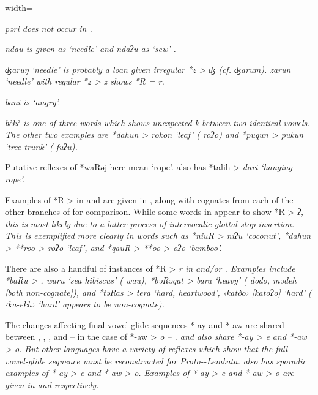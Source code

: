 \begin{table}[p]
\begin{adjustbox}{width=\textwidth}
\begin{threeparttable}
\begin{tablenotes}
{								\it{pəri} does not occur in \citet[155]{PareiraLewis1998}.}
			\item[v]	{ \it{ndau} is given as ‘needle’ and \it{ndaʔu} as ‘sew’ \citep[99]{Ismail1985}.}
			\item[vi]	{ \it{ʤaruŋ} ‘needle’ is probably a loan given irregular *z > \it{ʤ}
								(cf.  \it{ʤarum}).
								 \it{zarun} ‘needle’ with regular *z > \it{z} shows  *R = \it{r.}}
			\item[vii]	{ \it{bani} is ‘angry’.}
			\item[viii]	{ \it{\<bèkè\>} is one of three words which shows unexpected
								\it{k} between two identical vowels.
								The other two examples are *dahun > \it{rokon} ‘leaf’ ( \it{roʔo})
								and *puqun > \it{pukun} ‘tree trunk’ ( \it{fuʔu}).}
			\item[ix]	{Putative reflexes of *waRəj here mean ‘rope’.
								 also has *talih > \it{dari} ‘hanging rope’.}
		\end{tablenotes}
	\end{threeparttable}
\end{adjustbox}
\end{table}

Examples of *R > {\0} in 
and  are given in , along with cognates from each of the other branches
of  for comparison.
While some words in  appear to show *R > \it{ʔ},
this is most likely due to a latter process of intervocalic glottal stop insertion.
This is exemplified more clearly in words such as *niuR > \it{niʔu}
‘coconut’, *dahun > **roo > \it{roʔo} ‘leaf’,
and *qauR > **oo > \it{oʔo} ‘bamboo’.

There are also a handful of instances of *R > \it{r} in  and/or .
Examples include *baRu > ,
 \it{waru} ‘sea hibiscus’ ( \it{wau}),
*bəRəqat >  \it{bara} ‘heavy’ ( \it{dodo},
 \it{mədeh} [both non-cognate]),
and *təRas >  \it{tera} ‘hard,
heartwood’,  ‹katòo› [katoʔo] ‘hard’ ( ‹ka-ekh›
‘hard’ appears to be non-cognate).

The changes affecting final vowel-glide sequences *-ay
and *-aw are shared between ,
, , and -- in the case of *-aw > \it{o} -- .
 and  also share *-ay > \it{e}
and *-aw > \it{o}.
But other  languages have
a variety of reflexes which show that the full vowel-glide sequence
must be reconstructed for Proto--Lembata.
 also has sporadic examples of *-ay > \it{e}
and *-aw > \it{o}.
Examples of *-ay > \it{e}
and *-aw > \it{o} are given in 
and  respectively.


